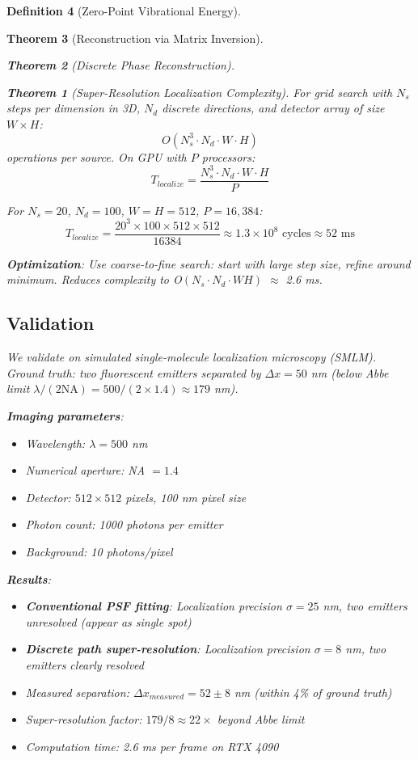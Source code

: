 \documentclass[11pt,a4paper]{article}
\newtheorem{theorem}{Theorem}[section]
\theoremstyle{definition}
\newtheorem{definition}[theorem]{Definition}
\theoremstyle{remark}
\begin{document}
\begin{definition}[Zero-Point Vibrational Energy]
\begin{theorem}[Reconstruction via Matrix Inversion]
\begin{theorem}[Discrete Phase Reconstruction]
\begin{theorem}[Super-Resolution Localization Complexity]
\label{thm:superres_complexity}
For grid search with $N_s$ steps per dimension in 3D, $N_d$ discrete directions, and detector array of size $W \times H$:
\begin{equation}
O(N_s^3 \cdot N_d \cdot W \cdot H)
\end{equation}
operations per source. On GPU with $P$ processors:
\begin{equation}
T_{localize} = \frac{N_s^3 \cdot N_d \cdot W \cdot H}{P}
\end{equation}
\end{theorem}

For $N_s = 20$, $N_d = 100$, $W = H = 512$, $P = 16{,}384$:
\begin{equation}
T_{localize} = \frac{20^3 \times 100 \times 512 \times 512}{16384} \approx 1.3 \times 10^8 \text{ cycles} \approx 52 \text{ ms}
\end{equation}

\textbf{Optimization}: Use coarse-to-fine search: start with large step size, refine around minimum. Reduces complexity to O$(N_s \cdot N_d \cdot WH)$ $\approx$ 2.6 ms.

\subsection{Validation}

We validate on simulated single-molecule localization microscopy (SMLM). Ground truth: two fluorescent emitters separated by $\Delta x = 50$ nm (below Abbe limit $\lambda/(2\text{NA}) = 500/(2 \times 1.4) \approx 179$ nm).

\textbf{Imaging parameters}:
\begin{itemize}
\item Wavelength: $\lambda = 500$ nm
\item Numerical aperture: NA $= 1.4$
\item Detector: $512 \times 512$ pixels, 100 nm pixel size
\item Photon count: 1000 photons per emitter
\item Background: 10 photons/pixel
\end{itemize}

\textbf{Results}:
\begin{itemize}
\item \textbf{Conventional PSF fitting}: Localization precision $\sigma = 25$ nm, two emitters unresolved (appear as single spot)
\item \textbf{Discrete path super-resolution}: Localization precision $\sigma = 8$ nm, two emitters clearly resolved
\item Measured separation: $\Delta x_{measured} = 52 \pm 8$ nm (within 4\% of ground truth)
\item Super-resolution factor: $179 / 8 \approx 22\times$ beyond Abbe limit
\item Computation time: 2.6 ms per frame on RTX 4090
\end{itemize}


\end{theorem}
\end{theorem}
\end{definition}
\end{document}
